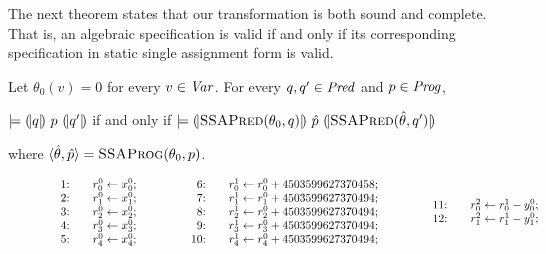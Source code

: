 The next theorem states that our transformation is both sound and
complete. That is, an algebraic specification is valid if and only if its
corresponding specification in static single assignment form is valid.
\begin{theorem}
  Let $\theta_0(v) = 0$ for every $v \in \mathit{Var}$. For every $q, q' \in \mathit{Pred}$
  and $p \in \mathit{Prog}$,
  \begin{center}
    $\models {(\!|}{q}{|\!)}~{p}~{(\!|}{q'}{|\!)}$ if and only if
    $\models {(\!|}{\textsc{SSAPred}(\theta_0, q)}{|\!)}~{\hat{p}}~{(\!|}{\textsc{SSAPred}(\hat{\theta}, q')}{|\!)}$
  \end{center}
  where $\langle \hat{\theta}, \hat{p} \rangle =
  \textsc{SSAProg}(\theta_0, p)$.
  \label{theorem:ssa}
\end{theorem}

\begin{figure}
  \centering
  \[
  \begin{array}{lclcl}
    \begin{array}{rcl}
    \textmd{1:} && {r}^0_0 \leftarrow {x}^0_0; \\
    \textmd{2:} && {r}^0_1 \leftarrow {x}^0_1; \\
    \textmd{3:} && {r}^0_2 \leftarrow {x}^0_2; \\
    \textmd{4:} && {r}^0_3 \leftarrow {x}^0_3; \\
    \textmd{5:} && {r}^0_4 \leftarrow {x}^0_4; \\
    \end{array}
    &\hspace{.05\textwidth}&
    \begin{array}{rcl}
    \textmd{6:} && 
      {r}^1_0 \leftarrow {r}^0_0 + {4503599627370458}; \\
    \textmd{7:} &&
      {r}^1_1 \leftarrow {r}^0_1 + {4503599627370494}; \\
    \textmd{8:} &&
      {r}^1_2 \leftarrow {r}^0_2 + {4503599627370494}; \\
    \textmd{9:} &&
      {r}^1_3 \leftarrow {r}^0_3 + {4503599627370494}; \\
    \textmd{10:} && 
      {r}^1_4 \leftarrow {r}^0_4 + {4503599627370494};\\
    \end{array}
    &\hspace{.05\textwidth}&
    \begin{array}{rcl}
    \textmd{11:} && {r}^2_0 \leftarrow {r}^1_0 - {y}^0_0; \\
    \textmd{12:} && {r}^2_1 \leftarrow {r}^1_1 - {y}^0_1; \\

\end{array}
\end{array}\]
\end{figure}

